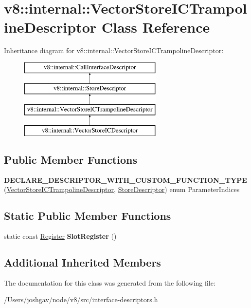 \hypertarget{classv8_1_1internal_1_1_vector_store_i_c_trampoline_descriptor}{}\section{v8\+:\+:internal\+:\+:Vector\+Store\+I\+C\+Trampoline\+Descriptor Class Reference}
\label{classv8_1_1internal_1_1_vector_store_i_c_trampoline_descriptor}
Inheritance diagram for v8\+:\+:internal\+:\+:Vector\+Store\+I\+C\+Trampoline\+Descriptor\+:\begin{figure}[H]
\begin{center}
\leavevmode
\includegraphics[height=4.000000cm]{classv8_1_1internal_1_1_vector_store_i_c_trampoline_descriptor}
\end{center}
\end{figure}
\subsection*{Public Member Functions}
\begin{DoxyCompactItemize}
\item 
{\bfseries D\+E\+C\+L\+A\+R\+E\+\_\+\+D\+E\+S\+C\+R\+I\+P\+T\+O\+R\+\_\+\+W\+I\+T\+H\+\_\+\+C\+U\+S\+T\+O\+M\+\_\+\+F\+U\+N\+C\+T\+I\+O\+N\+\_\+\+T\+Y\+PE} (\hyperlink{classv8_1_1internal_1_1_vector_store_i_c_trampoline_descriptor}{Vector\+Store\+I\+C\+Trampoline\+Descriptor}, \hyperlink{classv8_1_1internal_1_1_store_descriptor}{Store\+Descriptor}) enum Parameter\+Indices\hypertarget{classv8_1_1internal_1_1_vector_store_i_c_trampoline_descriptor_a2f5209c23dd15fb6c2231782ef759910}{}\label{classv8_1_1internal_1_1_vector_store_i_c_trampoline_descriptor_a2f5209c23dd15fb6c2231782ef759910}

\end{DoxyCompactItemize}
\subsection*{Static Public Member Functions}
\begin{DoxyCompactItemize}
\item 
static const \hyperlink{structv8_1_1internal_1_1_register}{Register} {\bfseries Slot\+Register} ()\hypertarget{classv8_1_1internal_1_1_vector_store_i_c_trampoline_descriptor_a1c379ed168b414fa1cdeab806d5dfcc3}{}\label{classv8_1_1internal_1_1_vector_store_i_c_trampoline_descriptor_a1c379ed168b414fa1cdeab806d5dfcc3}

\end{DoxyCompactItemize}
\subsection*{Additional Inherited Members}


The documentation for this class was generated from the following file\+:\begin{DoxyCompactItemize}
\item 
/\+Users/joshgav/node/v8/src/interface-\/descriptors.\+h\end{DoxyCompactItemize}
